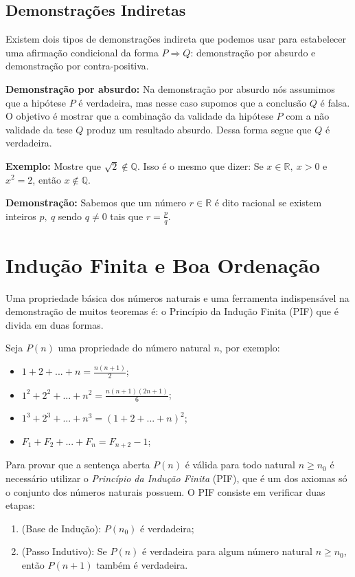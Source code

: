     \subsection{Demonstrações Indiretas}

Existem dois tipos de demonstrações indireta que podemos usar para estabelecer uma afirmação condicional da forma $P \Rightarrow Q$: demonstração por absurdo e demonstração por contra-positiva.

\noindent \textbf{Demonstração por absurdo:} Na demonstração por absurdo nós assumimos que a hipótese $P$ é verdadeira, mas nesse caso supomos que a conclusão $Q$ é falsa. O objetivo é mostrar que a combinação da validade da hipótese $P$ com a não validade da tese $Q$ produz um resultado absurdo. Dessa forma segue que $Q$ é verdadeira.

\noindent \textbf{Exemplo:} Mostre que $\sqrt{2} \notin \mathbb{Q}$. Isso é o mesmo que dizer: Se $x \in \mathbb{R}, \ x > 0 $ e $ x^2 = 2$, então $x \notin \mathbb{Q}$.

\noindent \textbf{Demonstração:} Sabemos que um número $r \in \mathbb{R}$ é dito racional se existem inteiros $p, \ q$ sendo $q \neq 0$ tais que $r = \frac{p}{q}$.
  
  
    \section{Indução Finita e Boa Ordenação}

Uma propriedade básica dos números naturais e uma ferramenta indispensável na demonstração de muitos teoremas é: o Princípio da Indução Finita (PIF) que é divida em duas formas.

Seja $P(n)$ uma propriedade do número natural $n$, por exemplo:
\begin{itemize}
  \item $1+2+...+n=\frac{n(n+1)}{2}$;
  \item $1^2 + 2^2 + ... + n^2 = \frac{n(n+1)(2n+1)}{6}$;
  \item $1^3 + 2^3 + ... + n^3 = (1 + 2 + ... + n)^2$;
  \item $F_1 + F_2 + ... + F_n = F_{n+2} - 1$;
\end{itemize}

Para provar que a sentença aberta $P(n)$ é válida para todo natural $n \geq n_0$ é necessário utilizar o \textit{Princípio da Indução Finita} (PIF), que é um dos axiomas só o conjunto dos números naturais possuem. O PIF consiste em verificar duas etapas:
\begin{enumerate}
	\item (Base de Indução): $P(n_0)$ é verdadeira;
	\item (Passo Indutivo): Se $P(n)$ é verdadeira para algum número natural $n \geq n_0$, então $P(n+1)$ também é verdadeira.
\end{enumerate}

